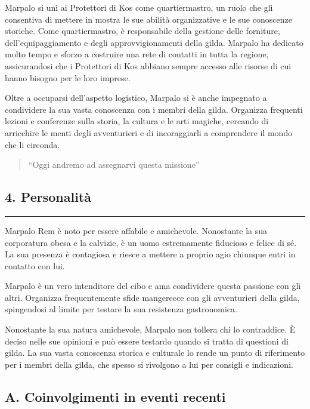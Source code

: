 Marpalo si unì ai Protettori di Kos come quartiermastro, un ruolo che
gli consentiva di mettere in mostra le sue abilità organizzative e le
sue conoscenze storiche. Come quartiermastro, è responsabile della
gestione delle forniture, dell'equipaggiamento e degli
approvvigionamenti della gilda. Marpalo ha dedicato molto tempo e sforzo
a costruire una rete di contatti in tutta la regione, assicurandosi che
i Protettori di Kos abbiano sempre accesso alle risorse di cui hanno
bisogno per le loro imprese.

Oltre a occuparsi dell'aspetto logistico, Marpalo si è anche impegnato a
condividere la sua vasta conoscenza con i membri della gilda. Organizza
frequenti lezioni e conferenze sulla storia, la cultura e le arti
magiche, cercando di arricchire le menti degli avventurieri e di
incoraggiarli a comprendere il mondo che li circonda.

\begin{quote}
``Oggi andremo ad assegnarvi questa missione''
\end{quote}

\subsection{4. Personalità}\label{personalituxe0}

\begin{center}\rule{0.5\linewidth}{0.5pt}\end{center}

Marpalo Rem è noto per essere affabile e amichevole. Nonostante la sua
corporatura obesa e la calvizie, è un uomo estremamente fiducioso e
felice di sé. La sua presenza è contagiosa e riesce a mettere a proprio
agio chiunque entri in contatto con lui.

Marpalo è un vero intenditore del cibo e ama condividere questa passione
con gli altri. Organizza frequentemente sfide mangerecce con gli
avventurieri della gilda, spingendosi al limite per testare la sua
resistenza gastronomica.

Nonostante la sua natura amichevole, Marpalo non tollera chi lo
contraddice. È deciso nelle sue opinioni e può essere testardo quando si
tratta di questioni di gilda. La sua vasta conoscenza storica e
culturale lo rende un punto di riferimento per i membri della gilda, che
spesso si rivolgono a lui per consigli e indicazioni.

\subsection{A. Coinvolgimenti in eventi
recenti}\label{a.-coinvolgimenti-in-eventi-recenti}

